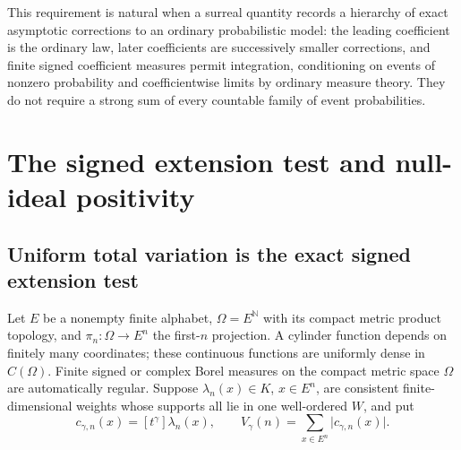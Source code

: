 \documentclass[11pt]{article}
\numberwithin{equation}{section}
\theoremstyle{definition}
\theoremstyle{remark}
\newcommand{\N}{\mathbb N}
\newcommand{\coef}[2]{[t^{#1}]#2}
\newcommand{\abs}[1]{\lvert#1\rvert}
\begin{document}
This requirement is natural when a surreal quantity records a hierarchy of exact
asymptotic corrections to an ordinary probabilistic model: the leading
coefficient is the ordinary law, later coefficients are successively smaller
corrections, and finite signed coefficient measures permit integration,
conditioning on events of nonzero probability and coefficientwise limits by
ordinary measure theory. They do not require a strong sum of every countable
family of event probabilities.

\section{The signed extension test and null-ideal positivity}
\label{meas:sec:coef-extension}

\subsection{Uniform total variation is the exact signed extension test}

Let $E$ be a nonempty finite alphabet, $\Omega=E^{\N}$ with its compact metric
product topology, and $\pi_n:\Omega\to E^n$ the first-$n$ projection. A cylinder
function depends on finitely many coordinates; these continuous functions are
uniformly dense in $C(\Omega)$. Finite signed or complex Borel measures on the
compact metric space $\Omega$ are automatically regular. Suppose
$\lambda_n(x)\in K$, $x\in E^n$, are consistent finite-dimensional weights whose
supports all lie in one well-ordered $W$, and put
\begin{equation}\label{meas:eq:variation}
 c_{\gamma,n}(x)=\coef{\gamma}{\lambda_n(x)},\qquad
 V_\gamma(n)=\sum_{x\in E^n}\abs{c_{\gamma,n}(x)}.
\end{equation}
\end{document}

